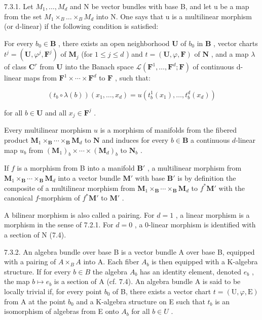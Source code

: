 7.3.1. Let \(M_{1},\ldots,M_{d}\) and N be vector bundles with base B, and let u be a map from the set \(M_{1}\times_{B}\ldots\times_{B}M_{d}\) into N. One says that u is a multilinear morphism (or d-linear) if the following condition is satisfied:

For every \(b_0 \in \mathbf{B}\) , there exists an open neighborhood \(\mathbf{U}\) of \(b_0\) in \(\mathbf{B}\) , vector charts \(t^j = (\mathbf{U}, \varphi^j, \mathbf{F}^j)\) of \(\mathbf{M}_j\) (for \(1 \leqslant j \leqslant d\) ) and \(t = (\mathbf{U}, \varphi, \mathbf{F})\) of \(\mathbf{N}\) , and a map \(\lambda\) of class \(\mathbf{C}^r\) from \(\mathbf{U}\) into the Banach space \(\mathcal{L}(\mathbf{F}^1, \ldots, \mathbf{F}^d; \mathbf{F})\) of continuous d-linear maps from \(\mathbf{F}^1 \times \cdots \times \mathbf{F}^d\) to \(\mathbf{F}\) , such that:

\[
(t _ {b} \circ \lambda (b)) (x _ {1}, \dots , x _ {d}) = u (t _ {b} ^ {1} (x _ {1}), \dots , t _ {b} ^ {d} (x _ {d}))
\]

for all \(b \in \mathbf{U}\) and all \(x_{j} \in \mathbf{F}^{j}\) .

Every multilinear morphism \(u\) is a morphism of manifolds from the fibered product \(\mathbf{M}_{1} \times_{\mathbf{B}} \cdots \times_{\mathbf{B}} \mathbf{M}_{d}\) to \(\mathbf{N}\) and induces for every \(b \in \mathbf{B}\) a continuous \(d\)-linear map \(u_b\) from \((\mathbf{M}_{1})_{b} \times \cdots \times (\mathbf{M}_{d})_{b}\) to \(\mathbf{N}_{b}\) .

If \(f\) is a morphism from B into a manifold \(\mathbf{B}'\) , a multilinear morphism from \(\mathbf{M}_1 \times_{\mathbf{B}} \cdots \times_{\mathbf{B}} \mathbf{M}_d\) into a vector bundle \(\mathbf{M}'\) with base \(\mathbf{B}'\) is by definition the composite of a multilinear morphism from \(\mathbf{M}_1 \times_{\mathbf{B}} \cdots \times_{\mathbf{B}} \mathbf{M}_d\) to \(f^*\mathbf{M}'\) with the canonical \(f\)-morphism of \(f^*\mathbf{M}'\) to \(\mathbf{M}'\) .

A bilinear morphism is also called a pairing. For \(d=1\) , a linear morphism is a morphism in the sense of 7.2.1. For \(d=0\) , a 0-linear morphism is identified with a section of N (7.4).

7.3.2. An algebra bundle over base B is a vector bundle A over base B, equipped with a pairing of \(A \times_{B} A\) into A. Each fiber \(A_{b}\) is then equipped with a K-algebra structure. If for every \(b \in B\) the algebra \(A_{b}\) has an identity element, denoted \(e_{b}\) , the map \(b \mapsto e_{b}\) is a section of A (cf. 7.4). An algebra bundle A is said to be locally trivial if, for every point \(b_{0}\) of B, there exists a vector chart \(t = (\mathrm{U}, \varphi, \mathrm{E})\) from A at the point \(b_{0}\) and a K-algebra structure on E such that \(t_{b}\) is an isomorphism of algebras from E onto \(A_{b}\) for all \(b \in U\) .

